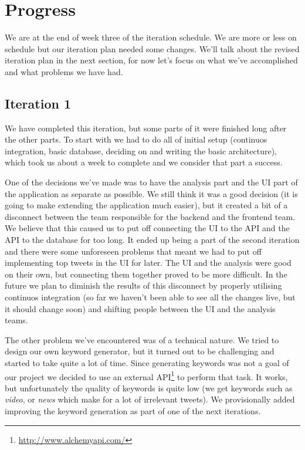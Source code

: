 \documentclass[a4paper,12pt]{article}
\begin{document}
	\section{Progress}
	We are at the end of week three of the iteration schedule. We are more or less on schedule but our iteration plan needed some changes. We'll talk about the revised iteration plan in the next section, for now let's focus on what we've accomplished and what problems we have had.
	
	\subsection{Iteration 1}
	We have completed this iteration, but some parts of it were finished long after the other parts. To start with we had to do all of initial setup (continuos integration, basic database, deciding on and writing the basic architecture), which took us about a week to complete and we consider that part a success.
	
	One of the decisions we've made was to have the analysis part and the UI part of the application as separate as possible. We still think it was a good decision (it is going to make extending the application much easier), but it created a bit of a disconnect between the team responsible for the backend and the frontend team. We believe that this caused us to put off connecting the UI to the API and the API to the database for too long. It ended up being a part of the second iteration and there were some unforeseen problems that meant we had to put off implementing top tweets in the UI for later. The UI and the analysis were good on their own, but connecting them together proved to be more difficult. In the future we plan to diminish the results of this disconnect by properly utilising continuos integration (so far we haven't been able to see all the changes live, but it should change soon) and shifting people between the UI and the analysis teams.
	
	The other problem we've encountered was of a technical nature. We tried to design our own keyword generator, but it turned out to be challenging and started to take quite a lot of time. Since generating keywords was not a goal of our project we decided to use an external API\footnote{\url{http://www.alchemyapi.com/}} to perform that task. It works, but unfortunately the quality of keywords is quite low (we get keywords such as \emph{video}, or \emph{news} which make for a lot of irrelevant tweets). We provisionally added improving the keyword generation as part of one of the next iterations.
	
\end{document}
